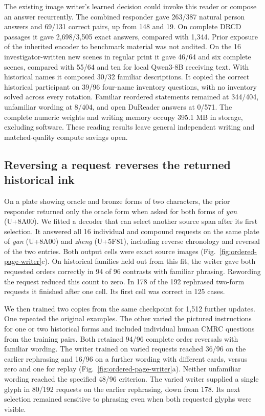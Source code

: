 \documentclass[12pt,a4paper]{article}
\providecommand{\DIFadd}[1]{{\protect\color{blue} \sf #1}} %
\begin{document}
\DIFadd{The existing image writer's learned decision could invoke this reader or compose an answer recurrently. The combined responder gave 263/387 natural person answers and 69/131 correct pairs, up from 148 and 19. On complete DRCD passages it gave 2,698/3,505 exact answers, compared with 1,344. Prior exposure of the inherited encoder to benchmark material was not audited. On the 16 investigator-written new scenes in regular print it gave 46/64 and six complete scenes, compared with 55/64 and ten for local Qwen3-8B receiving text. With historical names it composed 30/32 familiar descriptions. It copied the correct historical participant on 39/96 four-name inventory questions, with no inventory solved across every rotation. Familiar reordered statements remained at 344/404, unfamiliar wording at 8/404, and open DuReader answers at 0/571. The complete numeric weights and writing memory occupy 395.1 MB in storage, excluding software. These reading results leave general independent writing and matched-quality compute savings open.
}

\subsection*{\DIFadd{Reversing a request reverses the returned historical ink}}
\DIFadd{On a plate showing oracle and bronze forms of two characters, the prior responder returned only the oracle form when asked for both forms of \textit{yan} (U+8A00). We fitted a decoder that can select another source span after its first selection. It answered all 16 individual and compound requests on the same plate of \textit{yan} (U+8A00) and \textit{zheng} (U+5F81), including reverse chronology and reversal of the two entries. Both output cells were exact source images (Fig.~\ref{fig:ordered-page-writer}c). On historical families held out from this fit, the writer gave both requested orders correctly in 94 of 96 contrasts with familiar phrasing. Rewording the request reduced this count to zero. In 178 of the 192 rephrased two-form requests it finished after one cell. Its first cell was correct in 125 cases.
}

\DIFadd{We then trained two copies from the same checkpoint for 1,512 further updates. One repeated the original examples. The other varied the pictured instructions for one or two historical forms and included individual human CMRC questions from the training pairs. Both retained 94/96 complete order reversals with familiar wording. The writer trained on varied requests reached 36/96 on the earlier rephrasing and 16/96 on a further wording with different cards, versus zero and one for replay (Fig.~\ref{fig:ordered-page-writer}a). Neither unfamiliar wording reached the specified 48/96 criterion. The varied writer supplied a single glyph in 80/192 requests on the earlier rephrasing, down from 178. Its next selection remained sensitive to phrasing even when both requested glyphs were visible.
}
\end{document}
